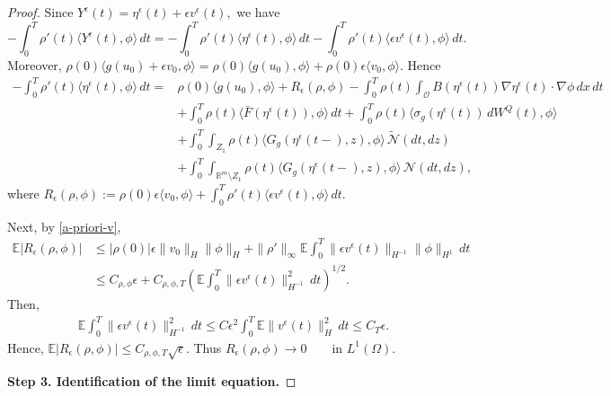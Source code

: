 \documentclass[11pt]{article}
\theoremstyle{plain}
\numberwithin{equation}{section}
\begin{document}
\begin{proof}
Since \(Y^\epsilon(t)=\eta^\epsilon(t)+\epsilon v^\epsilon(t),\)
we have
\[
-\int_0^T\rho'(t)\langle Y^\epsilon(t),\phi\rangle\,dt=-\int_0^T\rho'(t)\langle \eta^\epsilon(t),\phi\rangle\,dt
-\int_0^T\rho'(t)\langle \epsilon v^\epsilon(t),\phi\rangle\,dt .
\]
Moreover, \(\rho(0)\langle g(u_0)+\epsilon v_0,\phi\rangle=\rho(0)\langle g(u_0),\phi\rangle+\rho(0)\epsilon\langle v_0,\phi\rangle .\)
Hence
\[
\begin{aligned}-\int_0^T \rho'(t)\langle \eta^\epsilon(t),\phi\rangle\,dt
={}&\rho(0)\langle g(u_0),\phi\rangle+R_\epsilon(\rho,\phi)  -\int_0^T\rho(t)\int_{\mathcal O} B(\eta^\epsilon(t))\nabla\eta^\epsilon(t)\cdot\nabla\phi\,dx\,dt       \\
&+\int_0^T\rho(t)\langle \bar F(\eta^\epsilon(t)),\phi\rangle\,dt   +\int_0^T\rho(t)\langle \sigma_g(\eta^\epsilon(t))\,dW^Q(t),\phi\rangle   \\
&+\int_0^T\int_{Z_1}\rho(t)\langle G_g(\eta^\epsilon(t-),z),\phi\rangle\,\tilde{\mathcal N}(dt,dz)   \\
&+\int_0^T\int_{\mathbb R^m\setminus Z_1}\rho(t)\langle G_g(\eta^\epsilon(t-),z),\phi\rangle\, \mathcal N(dt,dz),
\end{aligned}
\]
where \(R_\epsilon(\rho,\phi):=\rho(0)\epsilon\langle v_0,\phi\rangle+\int_0^T\rho'(t)\langle \epsilon v^\epsilon(t),\phi\rangle\,dt .\)

Next, by \eqref{a-priori-v},
\[
\begin{aligned}
\mathbb E|R_\epsilon(\rho,\phi)|
&\le|\rho(0)|\epsilon\|v_0\|_H\|\phi\|_H+\|\rho'\|_\infty\mathbb E\int_0^T\|\epsilon v^\epsilon(t)\|_{H^{-1}}\|\phi\|_{H^1}\,dt        \\
&\le C_{\rho,\phi}\epsilon+ C_{\rho,\phi,T}\left(\mathbb E\int_0^T\|\epsilon v^\epsilon(t)\|_{H^{-1}}^2\,dt\right)^{1/2}.
\end{aligned}
\]
Then,
\[
\begin{aligned}
\mathbb E\int_0^T
\|\epsilon v^\epsilon(t)\|_{H^{-1}}^2\,dt  \le C\epsilon^2\int_0^T\mathbb E\|v^\epsilon(t)\|_H^2\,dt     \le C_T\epsilon .
\end{aligned}
\]
Hence, \(\mathbb E|R_\epsilon(\rho,\phi)| \le C_{\rho,\phi,T}\sqrt{\epsilon}.\) Thus \(R_\epsilon(\rho,\phi)\to0 \qquad \text{in }L^1(\Omega).\)


\medskip
\noindent\textbf{Step 3. Identification of the limit equation.}


\end{proof}
\end{document}

